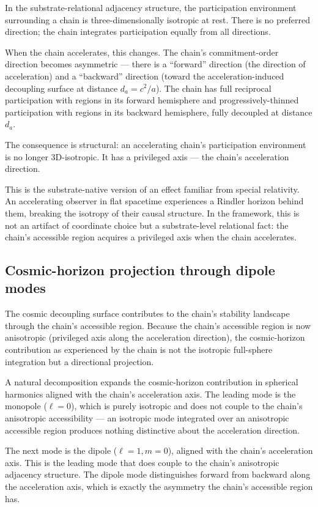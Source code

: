 \documentclass[11pt,a4paper]{article}
\begin{document}
In the substrate-relational adjacency structure, the participation environment surrounding a chain is three-dimensionally isotropic at rest. There is no preferred direction; the chain integrates participation equally from all directions.

When the chain accelerates, this changes. The chain's commitment-order direction becomes asymmetric --- there is a ``forward'' direction (the direction of acceleration) and a ``backward'' direction (toward the acceleration-induced decoupling surface at distance $d_a = c^2/a$). The chain has full reciprocal participation with regions in its forward hemisphere and progressively-thinned participation with regions in its backward hemisphere, fully decoupled at distance $d_a$.

The consequence is structural: an accelerating chain's participation environment is no longer 3D-isotropic. It has a privileged axis --- the chain's acceleration direction.

This is the substrate-native version of an effect familiar from special relativity. An accelerating observer in flat spacetime experiences a Rindler horizon behind them, breaking the isotropy of their causal structure. In the framework, this is not an artifact of coordinate choice but a substrate-level relational fact: the chain's accessible region acquires a privileged axis when the chain accelerates.

\subsection{Cosmic-horizon projection through dipole modes}

The cosmic decoupling surface contributes to the chain's stability landscape through the chain's accessible region. Because the chain's accessible region is now anisotropic (privileged axis along the acceleration direction), the cosmic-horizon contribution as experienced by the chain is not the isotropic full-sphere integration but a directional projection.

A natural decomposition expands the cosmic-horizon contribution in spherical harmonics aligned with the chain's acceleration axis. The leading mode is the monopole ($\ell = 0$), which is purely isotropic and does not couple to the chain's anisotropic accessibility --- an isotropic mode integrated over an anisotropic accessible region produces nothing distinctive about the acceleration direction.

The next mode is the dipole ($\ell = 1, m = 0$), aligned with the chain's acceleration axis. This is the leading mode that does couple to the chain's anisotropic adjacency structure. The dipole mode distinguishes forward from backward along the acceleration axis, which is exactly the asymmetry the chain's accessible region has.
\end{document}
